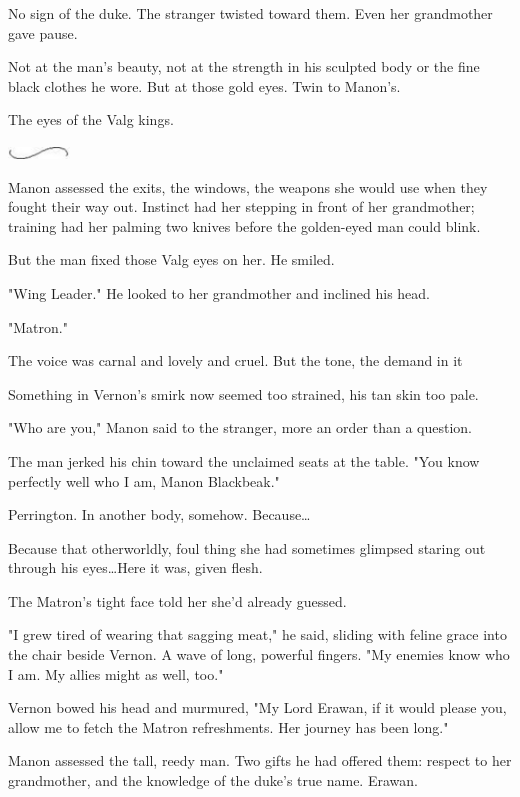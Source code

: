 No sign of the duke.
The stranger twisted toward them.
Even her grandmother gave pause.

Not at the man's beauty, not at the strength in his sculpted body or the fine black clothes he wore.
But at those gold eyes.
Twin to Manon's.

The eyes of the Valg kings.

\begin{center}
    \includegraphics[width=0.65in,height=0.13in]{images/seperator}
\end{center}

Manon assessed the exits, the windows, the weapons she would use when they fought their way out.
Instinct had her stepping in front of her grandmother; training had her palming two knives before the golden-eyed man could blink.

But the man fixed those Valg eyes on her.
He smiled.

"Wing Leader."
He looked to her grandmother and inclined his head.

"Matron."

The voice was carnal and lovely and cruel.
But the tone, the demand in it 

Something in Vernon's smirk now seemed too strained, his tan skin too pale.

"Who are you," Manon said to the stranger, more an order than a question.

The man jerked his chin toward the unclaimed seats at the table.
"You know perfectly well who I am, Manon Blackbeak."

Perrington.
In another body, somehow.
Because\ldots{}

Because that otherworldly, foul thing she had sometimes glimpsed staring out through his eyes\ldots Here it was, given flesh.

The Matron's tight face told her she'd already guessed.

"I grew tired of wearing that sagging meat," he said, sliding with feline grace into the chair beside Vernon.
A wave of long, powerful fingers.
"My enemies know who I am.
My allies might as well, too."

Vernon bowed his head and murmured, "My Lord Erawan, if it would please you, allow me to fetch the Matron refreshments.
Her journey has been long."

Manon assessed the tall, reedy man.
Two gifts he had offered them: respect to her grandmother, and the knowledge of the duke's true name.
Erawan.

